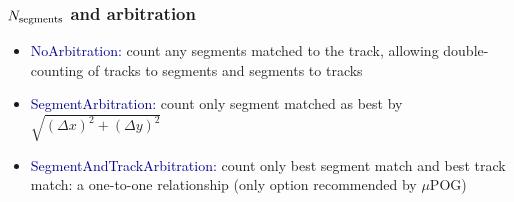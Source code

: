 \documentclass[compress]{beamer}
\newcommand{\s}[1]{{\mbox{\scriptsize #1}}}
\begin{document}
\begin{frame}
\frametitle{$N_\s{segments}$ and arbitration}

{\scriptsize
\begin{itemize}
\item \textcolor{darkblue}{NoArbitration:} count any segments matched to the track, allowing double-counting of tracks to segments and segments to tracks
\item \textcolor{darkblue}{SegmentArbitration:} count only segment matched as best by $\sqrt{(\Delta x)^2 + (\Delta y)^2}$
\item \textcolor{darkblue}{SegmentAndTrackArbitration:} count only best segment match and best track match: a one-to-one relationship (only option recommended by $\mu$POG)
\end{itemize}}


\end{frame}
\end{document}
